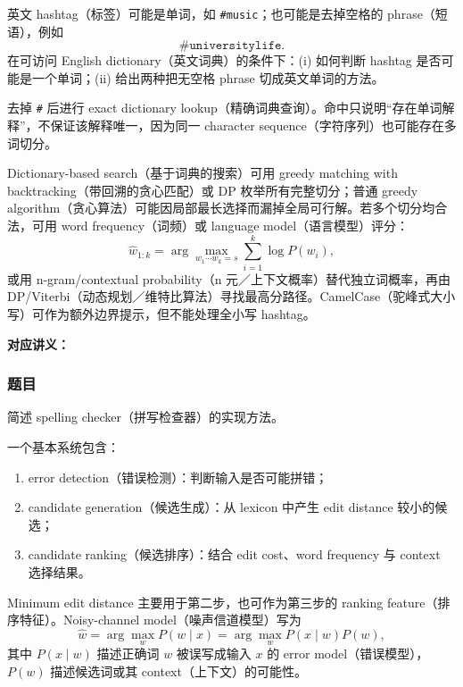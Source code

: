 英文 hashtag（标签）可能是单词，如 \texttt{\#music}；也可能是去掉空格的 phrase（短语），例如
\[
  \texttt{\#universitylife}.
\]
在可访问 English dictionary（英文词典）的条件下：(i) 如何判断 hashtag 是否可能是一个单词；(ii) 给出两种把无空格 phrase 切成英文单词的方法。

\begin{checkedsolution}
去掉 \texttt{\#} 后进行 exact dictionary lookup（精确词典查询）。命中只说明“存在单词解释”，不保证该解释唯一，因为同一 character sequence（字符序列）也可能存在多词切分。

Dictionary-based search（基于词典的搜索）可用 greedy matching with backtracking（带回溯的贪心匹配）或 DP 枚举所有完整切分；普通 greedy algorithm（贪心算法）可能因局部最长选择而漏掉全局可行解。若多个切分均合法，可用 word frequency（词频）或 language model（语言模型）评分：
\[
  \hat{w}_{1:k}
  =\arg\max_{w_1\cdots w_k=s}
    \sum_{i=1}^{k}\log P(w_i),
\]
或用 n-gram/contextual probability（n 元／上下文概率）替代独立词概率，再由 DP/Viterbi（动态规划／维特比算法）寻找最高分路径。CamelCase（驼峰式大小写）可作为额外边界提示，但不能处理全小写 hashtag。
\end{checkedsolution}


\textbf{对应讲义：}

\subsubsection*{题目}

简述 spelling checker（拼写检查器）的实现方法。

\begin{checkedsolution}
一个基本系统包含：
\begin{enumerate}
  \item error detection（错误检测）：判断输入是否可能拼错；
  \item candidate generation（候选生成）：从 lexicon 中产生 edit distance 较小的候选；
  \item candidate ranking（候选排序）：结合 edit cost、word frequency 与 context 选择结果。
\end{enumerate}
Minimum edit distance 主要用于第二步，也可作为第三步的 ranking feature（排序特征）。Noisy-channel model（噪声信道模型）写为
\[
  \hat{w}=\arg\max_w P(w\mid x)
  =\arg\max_w P(x\mid w)P(w),
\]
其中 $P(x\mid w)$ 描述正确词 $w$ 被误写成输入 $x$ 的 error model（错误模型），$P(w)$ 描述候选词或其 context（上下文）的可能性。
\end{checkedsolution}

